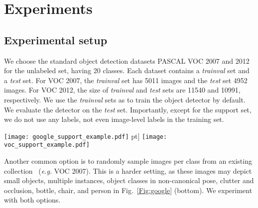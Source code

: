 \section{Experiments}
\label{sec:exp}

\subsection{Experimental setup}
\label{Sec:setup}

We choose the standard object detection datasets PASCAL VOC 2007 and 2012~\cite{pascalvoc} {for the unlabeled set}, having 20 classes. Each dataset contains a \emph{trainval} set and a \emph{test} set. For VOC 2007, the \emph{trainval} set has 5011 images and the \emph{test} set 4952 images. For VOC 2012, the size of \emph{trainval} and \emph{test} sets are 11540 and 10991, respectively.
{We use the \emph{trainval} sets as  to train the object detector by default.  We evaluate the detector on the \emph{test} set.}
{Importantly, except for the support set, we do not use any labels, not even image-level labels in the training set.}


\begin{figure*}[t]
	\centering
	\texttt{[image: google\_support\_example.pdf]} \3pt]
	\texttt{[image: voc\_support\_example.pdf]}
	\caption{\small (Top) examples of top-ranking web images, using class names as queries. (Bottom) random selection of images from PASCAL VOC 2007.  
	}
	\label{Fig:google}
\end{figure*}



{Another common
	option
	is to randomly
	sample  images per class
	from an existing collection~\cite{ShHX15,marvaniya2012drawing} (\emph{e.g.} VOC 2007). This is a harder setting,
	as these images may depict small objects, multiple instances, object classes in non-canonical pose, clutter and occlusion, \eg bottle, chair, and person in Fig.~\ref{Fig:google} (bottom). }
We experiment with both options.



